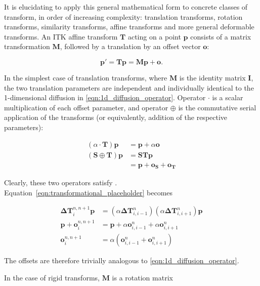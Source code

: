 	  It is elucidating to apply this general mathematical form to concrete classes of transform, in order of increasing complexity: translation transforms, rotation transforms, similarity transforms, affine transforms and more general deformable transforms. An ITK affine transform $\mathbf{T}$ acting on a point $\mathbf{p}$ consists of a matrix transformation $\mathbf{M}$, followed by a translation by an offset vector $\mathbf{o}$:
		
		\begin{equation}
			\mathbf{p'} = \mathbf{Tp}= \mathbf{Mp} + \mathbf{o}.
		\end{equation}
		
		In the simplest case of translation transforms, where $\mathbf{M}$ is the identity matrix $\mathbf{I}$, the two translation parameters are independent and individually identical to the 1-dimensional diffusion in \ref{eqn:1d_diffusion_operator}. Operator $\cdot$ is a scalar multiplication of each offset parameter, and operator $\oplus$ is the commutative serial application of the transforms (or equivalently, addition of the respective parameters):
		
		\begin{align}
			(\alpha \cdot \mathbf{T}) \mathbf{p} &= \mathbf{p} + \alpha\mathbf{o} \\
			(\mathbf{S} \oplus \mathbf{T}) \mathbf{p} &= \mathbf{STp} \\
			                                          &= \mathbf{p} + \mathbf{o_S} + \mathbf{o_T}
		\end{align}
		
		Clearly, these two operators satisfy . Equation~\ref{eqn:transformational_placeholder} becomes
		
		\begin{align}
		 	\mathbf{\Delta T}_i^{n,n+1} \mathbf{p} &= (\alpha \mathbf{\Delta T}_{i,i-1}^n) (\alpha \mathbf{\Delta T}_{i,i+1}^n) \mathbf{p} \\
			\mathbf{p} + \mathbf{o}_i^{n,n+1} &= \mathbf{p} + \alpha \mathbf{o}_{i,i-1}^n + \alpha \mathbf{o}_{i,i+1}^n \\
			\mathbf{o}_i^{n,n+1} &= \alpha (\mathbf{o}_{i,i-1}^n + \mathbf{o}_{i,i+1}^n) 
		\end{align}
		
		The offsets are therefore trivially analogous to \ref{eqn:1d_diffusion_operator}.
		
		In the case of rigid transforms, $\mathbf{M}$ is a rotation matrix
		
